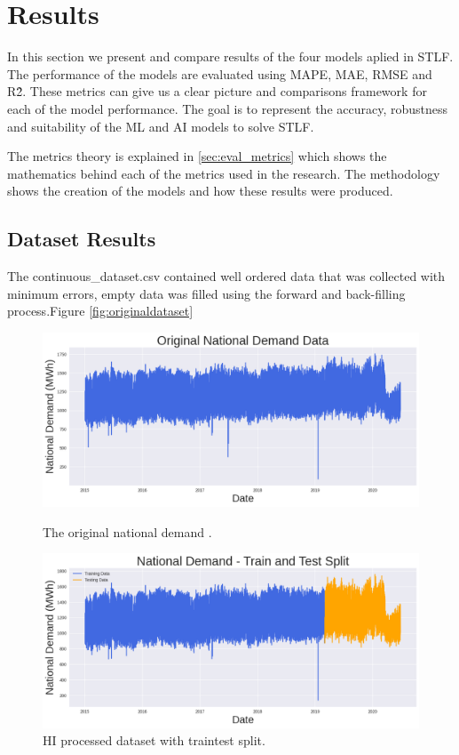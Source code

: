 \chapter{Results}
In this section we present and compare results of the four models aplied in STLF. The performance of the models are evaluated using MAPE, MAE, RMSE and R\^2. These metrics can give us a clear picture and comparisons framework for each of the model performance.  The goal is to represent the accuracy, robustness and suitability of the ML and AI models to solve STLF.

The metrics theory is explained in \ref{sec:eval_metrics} which shows the mathematics behind each of the metrics used in the research. The methodology shows the creation of the models and how these results were produced. 


\section{Dataset Results}
 The continuous\_dataset.csv contained well ordered data that was collected with minimum errors, empty data was filled using the forward and back-filling process.Figure \ref{fig:originaldataset}
 \begin{figure}[h]
 	\centering
 \begin{minipage}[b]{0.45\linewidth}
 	\centering
 	\includegraphics[width=\linewidth]{Chapters/images/results/original_dataset}
 	\caption{The original national demand .}
 	\label{fig:originaldataset}
 \end{minipage}
 \begin{minipage}[b]{0.45\linewidth}
 	\centering
 	\includegraphics[width=\linewidth]{"Chapters/images/results/train test split_after HI"}
 	\caption{HI processed dataset with traintest split.}
 	\label{fig:train-test-splitafter-hi}
 \end{minipage}
 \end{figure}
 
